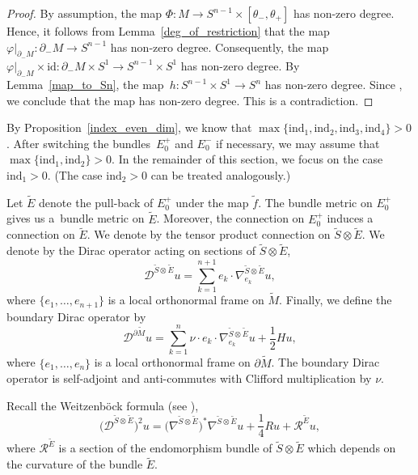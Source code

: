 \documentclass[11pt]{article}
\numberwithin{equation}{section}
\numberwithin{equation}{section}
\newcommand{\id}{\mathrm{id}}
\begin{document}
\begin{proof}
By assumption, the map $\Phi\colon M \to S^{n-1} \times [\theta_-,\theta_+]$ has non-zero degree.
Hence, it follows from Lemma~\ref{deg_of_restriction} that the map $\varphi|_{\partial_- M}\colon \partial_- M \to S^{n-1}$ has non-zero degree.
Consequently, the map $\varphi|_{\partial_- M} \times \id\colon \partial_- M \times S^1 \to S^{n-1} \times S^1$ has non-zero degree. By Lemma~\ref{map_to_Sn}, the map~${h\colon S^{n-1} \times S^1 \to S^n}$ has non-zero degree.
Since \smash{$\tilde{f}|_{\partial_- \tilde{M}} = h \circ (\varphi|_{\partial_- M} \times \id)$}, we conclude that the map  has non-zero degree.
This is a contradiction.
\end{proof}

By Proposition~\ref{index_even_dim}, we know that $\max \{\mathrm{ind}_1,\mathrm{ind}_2, \mathrm{ind}_3, \mathrm{ind}_4\} > 0$. After switching the bundles~$E_0^+$ and $E_0^-$ if necessary, we may assume that $\max \{\mathrm{ind}_1,\mathrm{ind}_2\} > 0$.
In the remainder of this section, we focus on the case $\mathrm{ind}_1 > 0$.
(The case $\mathrm{ind}_2 > 0$ can be treated analogously.)

Let $\tilde{E}$ denote the pull-back of $E_0^+$ under the map $\tilde{f}$. The bundle metric on $E_0^+$ gives us a~bundle metric on $\tilde{E}$. Moreover, the connection on $E_0^+$ induces a connection on $\tilde{E}$. We denote by  the tensor product connection on $\tilde{S} \otimes \tilde{E}$. We denote by  the Dirac operator acting on sections of $\tilde{S} \otimes \tilde{E}$,
\[
 \mathcal{D}^{\tilde{S} \otimes \tilde{E}} u = \sum_{k=1}^{n+1} e_k \cdot \nabla_{e_k}^{\tilde{S} \otimes \tilde{E}} u,
\]
where $\{e_1, \ldots, e_{n+1}\}$ is a local orthonormal frame on $\tilde{M}$.
Finally, we define the boundary Dirac operator by
\[
 \mathcal{D}^{\partial \tilde{M}} u = \sum_{k=1}^n \nu \cdot e_k \cdot \nabla_{e_k}^{\tilde{S} \otimes \tilde{E}} u + \frac{1}{2} H u,
\]
where $\{e_1,\hdots,e_n\}$ is a local orthonormal frame on $\partial \tilde{M}$.
The boundary Dirac operator is self-adjoint and anti-commutes with Clifford multiplication by $\nu$.

Recall the Weitzenb\"ock formula (see \cite[Theorem~8.17, Chapter~II]{Lawson-Michelsohn}),
\[
 \big(\mathcal{D}^{\tilde{S} \otimes \tilde{E}}\big)^2 u
 =
 \big(\nabla^{\tilde{S} \otimes \tilde{E}}\big)^*\nabla^{\tilde{S} \otimes \tilde{E}} u + \frac{1}{4} R u + \mathcal{R}^{\tilde{E}} u,
\]
where $\mathcal{R}^{\tilde{E}}$ is a section of the endomorphism bundle of $\tilde{S} \otimes \tilde{E}$ which depends on the curvature of the bundle $\tilde{E}$.
\end{document}
